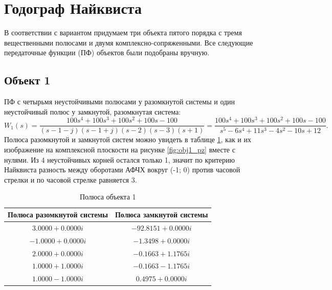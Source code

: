 \section{Годограф Найквиста}

В соответствии с вариантом придумаем три объекта пятого порядка с 
тремя вещественными полюсами и двумя комплексно-сопряженными. Все следующие
передаточные функции (ПФ) объектов были подобраны вручную.
 
\subsection{Объект 1}

ПФ с четырьмя неустойчивыми полюсами у разомкнутой системы и один неустойчивый полюс у замкнутой,
разомкнутая система:
\begin{equation*}
    W_1(s)=\frac{100s^4+100s^3+100s^2+100s-100}{(s-1-j)(s-1+j)(s-2)(s-3)(s+1)}
    = \frac{100s^4+100s^3+100s^2+100s-100}{s^5-6s^4+11s^3-4s^2-10s+12}.
\end{equation*}
Полюса разомкнутой и замкнутой систем можно увидеть в таблице \ref{tab:poles},
как и их изображение на комплексной плоскости на рисунке \ref{fig:obj1_pz}
вместе с нулями. Из 4 неустойчивых корней остался только 1, значит по критерию 
Найквиста разность между оборотами АФЧХ вокруг (-1; 0) против часовой стрелки и по часовой стрелке
равняется 3.

\begin{table}[h!]
    \centering
    \caption{Полюса объекта 1}
    \begin{tabular}{|c|c|}
    \hline
    \textbf{Полюса разомкнутой системы}       & \textbf{Полюса замкнутой системы}        \\ \hline
    $3.0000 + 0.0000i$ & $-92.8151 + 0.0000i$ \\ \hline
    $-1.0000 + 0.0000i$ & $-1.3498 + 0.0000i$ \\ \hline
    $2.0000 + 0.0000i$ & $-0.1663 + 1.1765i$  \\ \hline
    $1.0000 + 1.0000i$ & $-0.1663 - 1.1765i$  \\ \hline
    $1.0000 - 1.0000i$ & $0.4975 + 0.0000i$   \\ \hline
    \end{tabular}
    \label{tab:poles}
\end{table}
    

